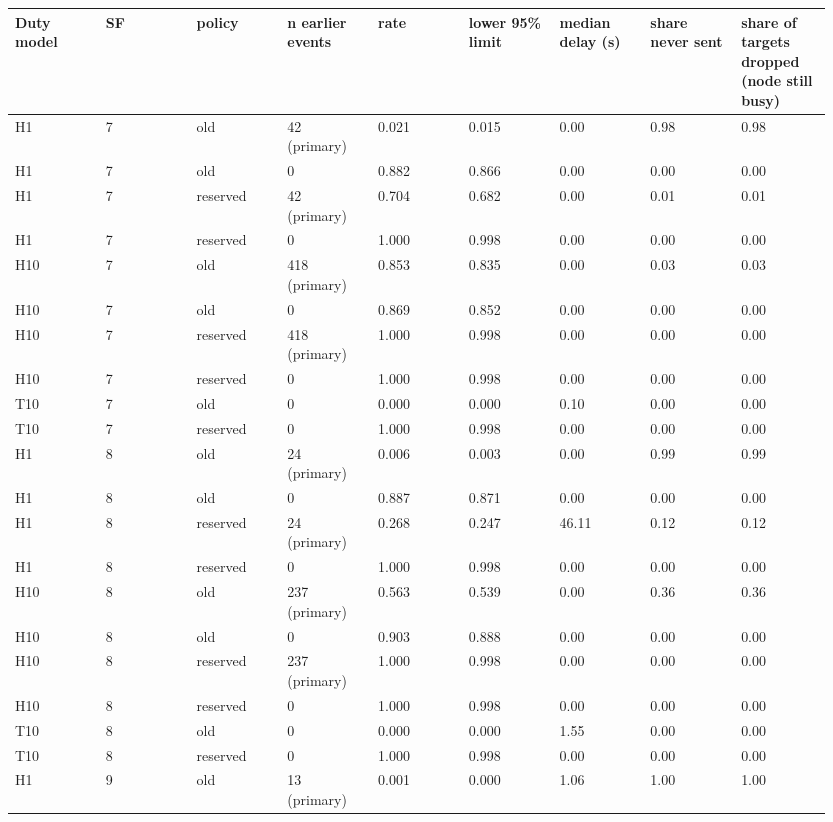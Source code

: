 {\scriptsize\raggedright
\begin{longtable}{p{0.106\linewidth}p{0.106\linewidth}p{0.106\linewidth}p{0.106\linewidth}p{0.106\linewidth}p{0.106\linewidth}p{0.106\linewidth}p{0.106\linewidth}p{0.106\linewidth}}
\toprule
Duty model & SF & policy & n earlier events & rate & lower 95\% limit & median delay (s) & share never sent & share of targets dropped (node still busy) \\
\midrule
\endhead
H1 & 7 & old & 42 (primary) & 0.021 & 0.015 & 0.00 & 0.98 & 0.98 \\
H1 & 7 & old & 0 & 0.882 & 0.866 & 0.00 & 0.00 & 0.00 \\
H1 & 7 & reserved & 42 (primary) & 0.704 & 0.682 & 0.00 & 0.01 & 0.01 \\
H1 & 7 & reserved & 0 & 1.000 & 0.998 & 0.00 & 0.00 & 0.00 \\
H10 & 7 & old & 418 (primary) & 0.853 & 0.835 & 0.00 & 0.03 & 0.03 \\
H10 & 7 & old & 0 & 0.869 & 0.852 & 0.00 & 0.00 & 0.00 \\
H10 & 7 & reserved & 418 (primary) & 1.000 & 0.998 & 0.00 & 0.00 & 0.00 \\
H10 & 7 & reserved & 0 & 1.000 & 0.998 & 0.00 & 0.00 & 0.00 \\
T10 & 7 & old & 0 & 0.000 & 0.000 & 0.10 & 0.00 & 0.00 \\
T10 & 7 & reserved & 0 & 1.000 & 0.998 & 0.00 & 0.00 & 0.00 \\
H1 & 8 & old & 24 (primary) & 0.006 & 0.003 & 0.00 & 0.99 & 0.99 \\
H1 & 8 & old & 0 & 0.887 & 0.871 & 0.00 & 0.00 & 0.00 \\
H1 & 8 & reserved & 24 (primary) & 0.268 & 0.247 & 46.11 & 0.12 & 0.12 \\
H1 & 8 & reserved & 0 & 1.000 & 0.998 & 0.00 & 0.00 & 0.00 \\
H10 & 8 & old & 237 (primary) & 0.563 & 0.539 & 0.00 & 0.36 & 0.36 \\
H10 & 8 & old & 0 & 0.903 & 0.888 & 0.00 & 0.00 & 0.00 \\
H10 & 8 & reserved & 237 (primary) & 1.000 & 0.998 & 0.00 & 0.00 & 0.00 \\
H10 & 8 & reserved & 0 & 1.000 & 0.998 & 0.00 & 0.00 & 0.00 \\
T10 & 8 & old & 0 & 0.000 & 0.000 & 1.55 & 0.00 & 0.00 \\
T10 & 8 & reserved & 0 & 1.000 & 0.998 & 0.00 & 0.00 & 0.00 \\
H1 & 9 & old & 13 (primary) & 0.001 & 0.000 & 1.06 & 1.00 & 1.00 \\

\end{longtable}}
